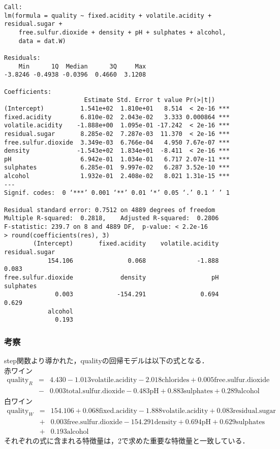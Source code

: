 \documentclass{jsarticle}
\begin{document}
\begin{verbatim}
Call:
lm(formula = quality ~ fixed.acidity + volatile.acidity + residual.sugar + 
    free.sulfur.dioxide + density + pH + sulphates + alcohol, 
    data = dat.W)

Residuals:
    Min      1Q  Median      3Q     Max 
-3.8246 -0.4938 -0.0396  0.4660  3.1208 

Coefficients:
                      Estimate Std. Error t value Pr(>|t|)    
(Intercept)          1.541e+02  1.810e+01   8.514  < 2e-16 ***
fixed.acidity        6.810e-02  2.043e-02   3.333 0.000864 ***
volatile.acidity    -1.888e+00  1.095e-01 -17.242  < 2e-16 ***
residual.sugar       8.285e-02  7.287e-03  11.370  < 2e-16 ***
free.sulfur.dioxide  3.349e-03  6.766e-04   4.950 7.67e-07 ***
density             -1.543e+02  1.834e+01  -8.411  < 2e-16 ***
pH                   6.942e-01  1.034e-01   6.717 2.07e-11 ***
sulphates            6.285e-01  9.997e-02   6.287 3.52e-10 ***
alcohol              1.932e-01  2.408e-02   8.021 1.31e-15 ***
---
Signif. codes:  0 ‘***’ 0.001 ‘**’ 0.01 ‘*’ 0.05 ‘.’ 0.1 ‘ ’ 1

Residual standard error: 0.7512 on 4889 degrees of freedom
Multiple R-squared:  0.2818,    Adjusted R-squared:  0.2806 
F-statistic: 239.7 on 8 and 4889 DF,  p-value: < 2.2e-16
> round(coefficients(res), 3)
        (Intercept)       fixed.acidity    volatile.acidity      residual.sugar 
            154.106               0.068              -1.888               0.083 
free.sulfur.dioxide             density                  pH           sulphates 
              0.003            -154.291               0.694               0.629 
            alcohol 
              0.193 
\end{verbatim}

\subsubsection*{考察}
step関数より導かれた，qualityの回帰モデルは以下の式となる．\\
赤ワイン
\begin{eqnarray}
	\mathrm{quality}_R &=& 4.430
	- 1.013 \mathrm{volatile.acidity}
	- 2.018 \mathrm{chlorides}
	+ 0.005 \mathrm{free.sulfur.dioxide} \nonumber \\
	&-& 0.003 \mathrm{total.sulfur.dioxide}
	- 0.483 \mathrm{pH}
	+ 0.883 \mathrm{sulphates}
	+ 0.289 \mathrm{alcohol} \nonumber
\end{eqnarray}
白ワイン
\begin{eqnarray}
	\mathrm{quality}_W &=& 154.106 
	+ 0.068 \mathrm{fixed.acidity}
	- 1.888 \mathrm{volatile.acidity}
	+ 0.083 \mathrm{residual.sugar} \nonumber \\
	&+& 0.003 \mathrm{free.sulfur.dioxide}
	- 154.291 \mathrm{density}
	+ 0.694 \mathrm{pH}
	+ 0.629 \mathrm{sulphates} \nonumber \\
	&+& 0.193 \mathrm{alcohol} \nonumber
\end{eqnarray}
それぞれの式に含まれる特徴量は，2で求めた重要な特徴量と一致している．
\end{document}
